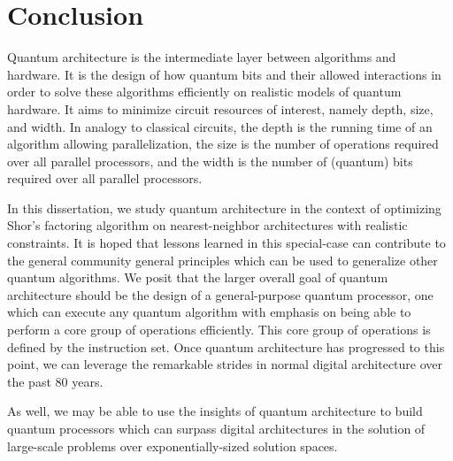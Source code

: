 \chapter{Conclusion}
\label{chap:conclude}

Quantum architecture is the intermediate layer between algorithms and hardware.
It is the design of how quantum bits and their allowed interactions in order
to solve these algorithms efficiently on realistic models of quantum hardware.
It aims to minimize circuit resources of interest, namely depth, size, and
width. In analogy to classical circuits, the depth is the running time of an
algorithm allowing parallelization, the size is the number of operations
required over all parallel processors, and the width is the number of
(quantum) bits required over all parallel processors.

In this dissertation, we study quantum architecture in the context of
optimizing Shor's factoring algorithm on nearest-neighbor architectures with
realistic constraints. It is hoped that lessons learned in this special-case
can contribute to the general community general principles which can be used
to generalize other quantum algorithms. We posit that the larger overall goal
of quantum architecture should be the design of a general-purpose quantum
processor, one which can execute any quantum algorithm with emphasis on being
able to perform a core group of operations efficiently. This core group of
operations is defined by the instruction set. Once quantum architecture has
progressed to this point, we can leverage the remarkable strides in normal
digital architecture over the past 80 years.

As well, we may be able to use the insights of quantum architecture to build
quantum processors which can surpass digital architectures in the solution of
large-scale problems over exponentially-sized solution spaces.
